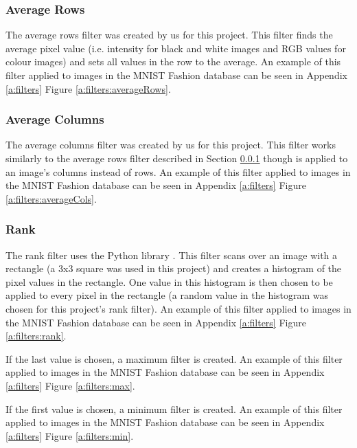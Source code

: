 		\subsubsection{Average Rows} \label{s:filters:descriptions:averageRows}
			The average rows filter was created by us for this project. This filter finds the average pixel value (i.e. intensity for black and white images and RGB values for colour images) and sets all values in the row to the average. An example of this filter applied to images in the MNIST Fashion database \cite{zalandoresearchFashionMNIST} can be seen in Appendix \ref{a:filters} Figure \ref{a:filters:averageRows}.

		\subsubsection{Average Columns} \label{s:filters:descriptions:averageCols}
			The average columns filter was created by us for this project. This filter works similarly to the average rows filter described in Section \ref{s:filters:descriptions:averageRows} though is applied to an image's columns instead of rows. An example of this filter applied to images in the MNIST Fashion database \cite{zalandoresearchFashionMNIST} can be seen in Appendix \ref{a:filters} Figure \ref{a:filters:averageCols}.

		\subsubsection{Rank} \label{s:filters:descriptions:rank}
			The rank filter uses the Python library  \cite{scipy}. This filter scans over an image with a rectangle (a 3x3 square was used in this project) and creates a histogram of the pixel values in the rectangle. One value in this histogram is then chosen to be applied to every pixel in the rectangle (a random value in the histogram was chosen for this project's rank filter). An example of this filter applied to images in the MNIST Fashion database \cite{zalandoresearchFashionMNIST} can be seen in Appendix \ref{a:filters} Figure \ref{a:filters:rank}.

			If the last value is chosen, a maximum filter is created. An example of this filter applied to images in the MNIST Fashion database \cite{zalandoresearchFashionMNIST} can be seen in Appendix \ref{a:filters} Figure \ref{a:filters:max}.

			If the first value is chosen, a minimum filter is created. An example of this filter applied to images in the MNIST Fashion database \cite{zalandoresearchFashionMNIST} can be seen in Appendix \ref{a:filters} Figure \ref{a:filters:min}.

